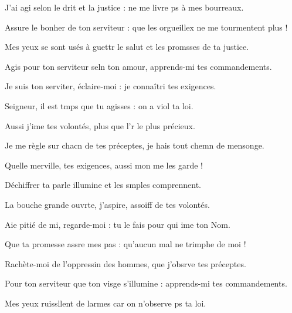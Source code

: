 \item J’ai agi selon le drit et la justice :\psstar{} ne me livre ps à mes bourreaux.
\item Assure le bonher de ton serviteur :\psstar{} que les orgueillex ne me tourmentent plus !
\item Mes yeux se sont usés à guettr le salut\psstar{} et les promsses de ta justice.
\item Agis pour ton serviteur seln ton amour,\psstar{} apprends-mi tes commandements.
\item Je suis ton serviter, éclaire-moi :\psstar{} je connaîtri tes exigences.
\item Seigneur, il est tmps que tu agisses :\psstar{} on a viol ta loi.
\item Aussi j’ime tes volontés,\psstar{} plus que l’r le plus précieux.
\item Je me règle sur chacn de tes préceptes,\psstar{} je hais tout chemn de mensonge.
\item Quelle merville, tes exigences,\psstar{} aussi mon me les garde !
\item Déchiffrer ta parle illumine\psstar{} et les smples comprennent.
\item La bouche grande ouvrte, j’aspire,\psstar{} assoiff de tes volontés.
\item Aie pitié de mi, regarde-moi :\psstar{} tu le fais pour qui ime ton Nom.
\item Que ta promesse assre mes pas :\psstar{} qu’aucun mal ne trimphe de moi !
\item Rachète-moi de l’oppressin des hommes,\psstar{} que j’obsrve tes préceptes.
\item Pour ton serviteur que ton visge s’illumine :\psstar{} apprends-mi tes commandements.
\item Mes yeux ruissllent de larmes\psstar{} car on n’observe ps ta loi.